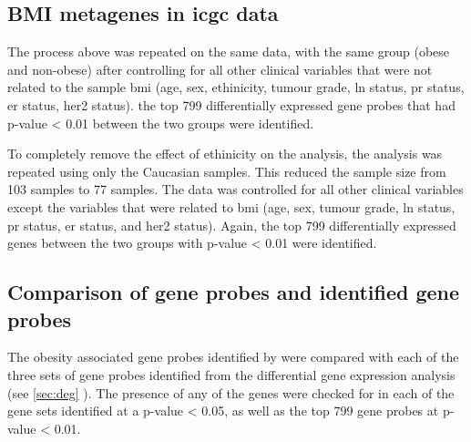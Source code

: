 \subsection{BMI metagenes in \gls{icgc} data}
\label{subsec:bmidegmetaicgc}

























\newpage



The process above was repeated on the same data, with the same group (obese and non-obese) after controlling for all other clinical variables that were not related to the sample \gls{bmi} (age, sex, ethinicity, tumour grade, \gls{ln} status, \gls{pr} status, \gls{er} status, \gls{her2} status).
the top 799 differentially expressed gene probes that had p-value \textless{} 0.01 between the two groups were identified.

To completely remove the effect of ethinicity on the analysis, the analysis was repeated using only the Caucasian samples.
This reduced the sample size from 103 samples to 77 samples.
The data was controlled for all other clinical variables except the variables that were related to \gls{bmi} (age, sex, tumour grade, \gls{ln} status, \gls{pr} status, \gls{er} status, and \gls{her2} status).
Again, the top 799 differentially expressed genes between the two groups with p-value \textless{} 0.01 were identified.

\subsection{Comparison of \citet{Creighton2012} gene probes and identified gene probes}
\label{subsec:cfgeneprobes}

The obesity associated gene probes identified by \citet{Creighton2012} were compared with each of the three sets of gene probes identified from the differential gene expression analysis (see \cref{sec:deg} ).
The presence of any of the \citet{Creighton2012} genes were checked for in each of the gene sets identified at a p-value \textless{} 0.05, as well as the top 799 gene probes at p-value \textless{} 0.01.


